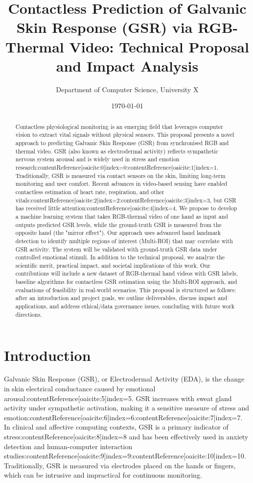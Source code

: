 \documentclass[12pt]{article}
\title{\textbf{Contactless Prediction of Galvanic Skin Response (GSR) via RGB-Thermal Video: Technical Proposal and Impact Analysis}}
\author{Department of Computer Science, University X}
\date{\today}
\begin{document}
    \maketitle

    \begin{abstract}
        Contactless physiological monitoring is an emerging field that leverages computer vision to extract vital signals without physical sensors. This proposal presents a novel approach to predicting Galvanic Skin Response (GSR) from synchronised RGB and thermal video. GSR (also known as electrodermal activity) reflects sympathetic nervous system arousal and is widely used in stress and emotion research:contentReference[oaicite:0]{index=0}:contentReference[oaicite:1]{index=1}. Traditionally, GSR is measured via contact sensors on the skin, limiting long-term monitoring and user comfort. Recent advances in video-based sensing have enabled contactless estimation of heart rate, respiration, and other vitals:contentReference[oaicite:2]{index=2}:contentReference[oaicite:3]{index=3}, but GSR has received little attention:contentReference[oaicite:4]{index=4}. We propose to develop a machine learning system that takes RGB-thermal video of one hand as input and outputs predicted GSR levels, while the ground-truth GSR is measured from the opposite hand (the "mirror effect"). Our approach uses advanced hand landmark detection to identify multiple regions of interest (Multi-ROI) that may correlate with GSR activity. The system will be validated with ground-truth GSR data under controlled emotional stimuli. In addition to the technical proposal, we analyze the scientific merit, practical impact, and societal implications of this work. Our contributions will include a new dataset of RGB-thermal hand videos with GSR labels, baseline algorithms for contactless GSR estimation using the Multi-ROI approach, and evaluations of feasibility in real-world scenarios. This proposal is structured as follows: after an introduction and project goals, we outline deliverables, discuss impact and applications, and address ethical/data governance issues, concluding with future work directions.
    \end{abstract}

    \tableofcontents


    \section{Introduction}
    Galvanic Skin Response (GSR), or Electrodermal Activity (EDA), is the change in skin electrical conductance caused by emotional arousal:contentReference[oaicite:5]{index=5}. GSR increases with sweat gland activity under sympathetic activation, making it a sensitive measure of stress and emotion:contentReference[oaicite:6]{index=6}:contentReference[oaicite:7]{index=7}. In clinical and affective computing contexts, GSR is a primary indicator of stress:contentReference[oaicite:8]{index=8} and has been effectively used in anxiety detection and human-computer interaction studies:contentReference[oaicite:9]{index=9}:contentReference[oaicite:10]{index=10}. Traditionally, GSR is measured via electrodes placed on the hands or fingers, which can be intrusive and impractical for continuous monitoring.
\end{document}
